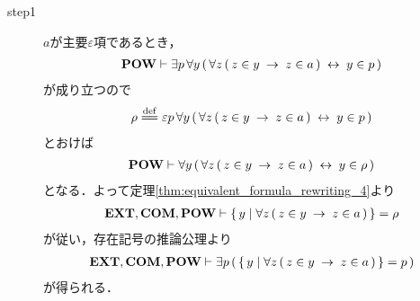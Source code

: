 	\begin{sketch}\mbox{}
		\begin{description}
			\item[step1]
				$a$が主要$\varepsilon$項であるとき，
				\begin{align}
					\mbox{{\bf POW}} \vdash \exists p\, \forall y\, (\, \forall z\, (\, z \in y \hspace{0.25em}\rightarrow\hspace{0.25em} z \in a\, ) \hspace{0.25em}\leftrightarrow\hspace{0.25em} y \in p\, )
				\end{align}
				が成り立つので
				\begin{align}
					\rho \defeq \varepsilon p\, \forall y\, (\, \forall z\, (\, z \in y \rarrow z \in a\, ) \lrarrow y \in p\, )
				\end{align}
				とおけば
				\begin{align}
					\mbox{{\bf POW}} \vdash \forall y\, (\, \forall z\, (\, z \in y \hspace{0.25em}\rightarrow\hspace{0.25em} z \in a\, ) \hspace{0.25em}\leftrightarrow\hspace{0.25em} y \in \rho\, )
					\label{fom:power_of_a_set_is_a_set_1}
				\end{align}
				となる．よって定理\ref{thm:equivalent_formula_rewriting_4}より
				\begin{align}
					\mbox{{\bf EXT}},\mbox{\bf COM},\mbox{{\bf POW}} \vdash 
					\{\, y \mid \forall z\, (\, z \in y \hspace{0.25em}\rightarrow\hspace{0.25em} z \in a\, )\, \} = \rho
				\end{align}
				が従い，存在記号の推論公理より
				\begin{align}
					\mbox{{\bf EXT}},\mbox{\bf COM},\mbox{{\bf POW}} \vdash \exists p\, 
					(\, \{\, y \mid \forall z\, (\, z \in y \hspace{0.25em}\rightarrow\hspace{0.25em} z \in a\, )\, \} = p\, )
				\end{align}
				が得られる．
				

\end{description}
\end{sketch}
